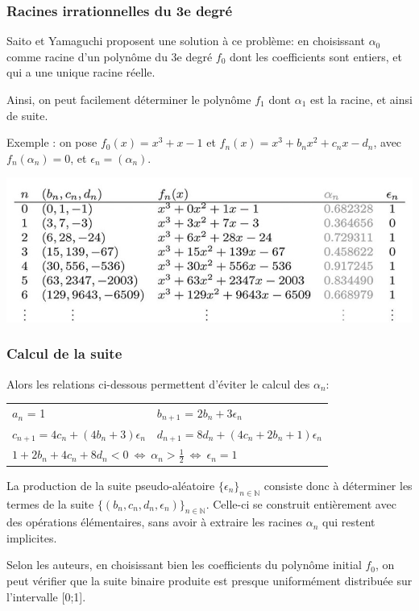 \documentclass{scrartcl}
\begin{document}
\subsubsection{Racines irrationnelles du 3e degré}\label{ss:saito}
Saito et Yamaguchi \cite{SY} proposent une solution à ce problème: en
choisissant $\alpha_0$ comme racine d’un polynôme du 3e degré $f_0$ dont les
coefficients sont entiers, et qui a une unique racine réelle. \par
Ainsi, on peut facilement déterminer le polynôme $f_1$ dont $\alpha_1$ est la
racine, et ainsi de suite. \par
Exemple : on pose $f_0(x) = x^3+x-1$ et $f_n(x) = x^3+b_nx^2+c_nx-d_n$, avec
$f_n(\alpha_n) = 0$, et $\epsilon_n = (\alpha_n)$.
\begin{center}
  \includegraphics[scale=0.75]{img/SaitoYamaguchi2017.png}  
\end{center}

\subsubsection{Calcul de la suite}
Alors les relations ci-dessous permettent d'éviter le calcul des $\alpha_n$:\par
\begin{tabular}{ l l }
  $a_n$ = 1 & $b_{n+1}$ = $2b_n+3\epsilon_n$ \\
  $c_{n+1} = 4c_n+(4b_n+3)\epsilon_n$ 
            & $d_{n+1} = 8d_n+(4c_n+2b_n+1)\epsilon_n$ \\
  \multicolumn{2}{l}{$1 + 2b_n + 4c_n + 8d_n < 0 \ \Leftrightarrow \ \alpha_n > \frac{1}{2} \ \Leftrightarrow \ \epsilon_n = 1 $}
\end{tabular}\par
La production de la suite pseudo-aléatoire
$\{\epsilon_n\}_{n \in \mathbb{N}}$ consiste donc à déterminer les termes de la
suite $\{ (b_n,c_n,d_n,\epsilon_n) \}_{n \in \mathbb{N}}$. Celle-ci se construit
entièrement avec des opérations élémentaires, sans avoir à extraire les racines
$\alpha_n$ qui restent implicites. \par
\medskip Selon les auteurs, en choisissant bien les coefficients du polynôme
initial $f_0$, on peut vérifier que la suite binaire produite est presque
uniformément distribuée sur l’intervalle [0;1]. \par
\end{document}
